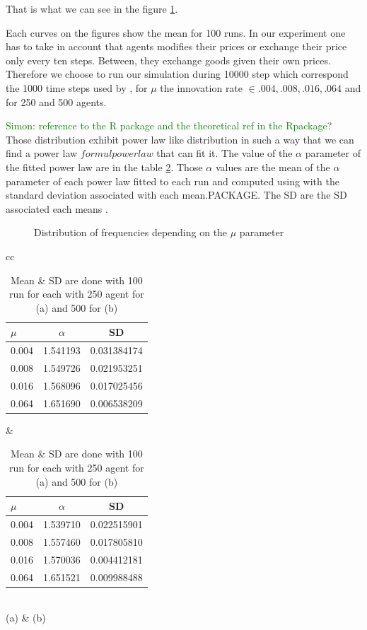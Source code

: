 \documentclass{wscpaperproc}
\newcommand{\memo}[2]{\textcolor{#1}{#2}}
\newcommand{\simon}[1]{\memo{green}{Simon: #1\\}}
\begin{document}
That is what we can see in the figure \ref{fig:allMutation}.

Each curves on the figures show the mean for 100 runs. In our experiment one has to take in account that agents modifies their prices or exchange their price only every ten steps. Between, they exchange goods given their own prices. Therefore we choose to run our simulation during 10000 step which correspond the 1000 time steps used by \cite{bentley_random_2004,mesoudi_random_2009}, for $\mu$ the innovation rate $\in {.004,.008,.016,.064}$ and for 250 and 500 agents.

\simon{reference to the R package and the theoretical ref in the Rpackage?}
Those distribution exhibit power law like distribution in such a way that we can find a power law $formul powerlaw$ that can fit it. The value of the $\alpha$ parameter of the fitted power law are in the table \ref{tab:mualpha}. Those $\alpha$ values are the mean of the $\alpha$ parameter of each power law fitted to each run and computed using with the standard deviation associated with each mean.PACKAGE. The SD are the SD associated each means .
\begin{figure}[hbp]
	\begin{center}
	\end{center}
	\caption{Distribution of frequencies depending on the $\mu$ parameter}
	\label{fig:allMutation}
\end{figure}


\begin{table}
	\centering
	\begin{tabular}{cc}
		\begin{tabular}{l|cc}
			$\mu$ & $\alpha$ & SD\\\hline
			0.004&1.541193&0.031384174\\
			0.008&1.549726&0.021953251\\
			0.016&1.568096&0.017025456\\
			0.064&1.651690&0.006538209\\

		\end{tabular}
		&
		\begin{tabular}{l|cc}
			$\mu$ & $\alpha$ & SD\\\hline
			0.004&1.539710&0.022515901\\
			0.008&1.557460&0.017805810\\
			0.016&1.570036&0.004412181\\
			0.064&1.651521&0.009988488\\
		\end{tabular}\\
		(a) & (b)
	\end{tabular}
	\caption{Mean \& SD are done with 100 run for each with 250 agent for (a) and 500 for (b) }
	\label{tab:mualpha}
\end{table}
\end{document}

